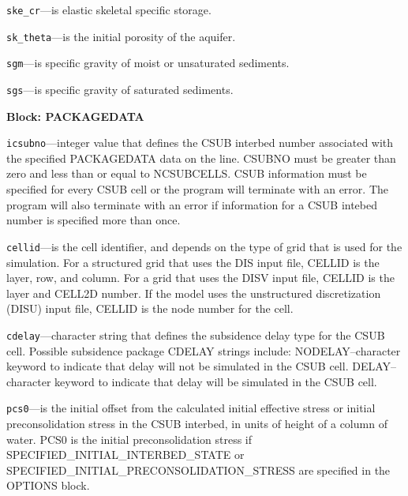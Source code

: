 \begin{description}
\item \texttt{ske\_cr}---is elastic skeletal specific storage.

\item \texttt{sk\_theta}---is the initial porosity of the aquifer.

\item \texttt{sgm}---is specific gravity of moist or unsaturated sediments.

\item \texttt{sgs}---is specific gravity of saturated sediments.

\end{description}
\item \textbf{Block: PACKAGEDATA}

\begin{description}
\item \texttt{icsubno}---integer value that defines the CSUB interbed number associated with the specified PACKAGEDATA data on the line. CSUBNO must be greater than zero and less than or equal to NCSUBCELLS.  CSUB information must be specified for every CSUB cell or the program will terminate with an error.  The program will also terminate with an error if information for a CSUB intebed number is specified more than once.

\item \texttt{cellid}---is the cell identifier, and depends on the type of grid that is used for the simulation.  For a structured grid that uses the DIS input file, CELLID is the layer, row, and column.   For a grid that uses the DISV input file, CELLID is the layer and CELL2D number.  If the model uses the unstructured discretization (DISU) input file, CELLID is the node number for the cell.

\item \texttt{cdelay}---character string that defines the subsidence delay type for the CSUB cell. Possible subsidence package CDELAY strings include: NODELAY--character keyword to indicate that delay will not be simulated in the CSUB cell.  DELAY--character keyword to indicate that delay will be simulated in the CSUB cell.

\item \texttt{pcs0}---is the initial offset from the calculated initial effective stress or initial preconsolidation stress in the CSUB interbed, in units of height of a column of water. PCS0 is the initial preconsolidation stress if SPECIFIED\_INITIAL\_INTERBED\_STATE or SPECIFIED\_INITIAL\_PRECONSOLIDATION\_STRESS are specified in the OPTIONS block.


\end{description}
